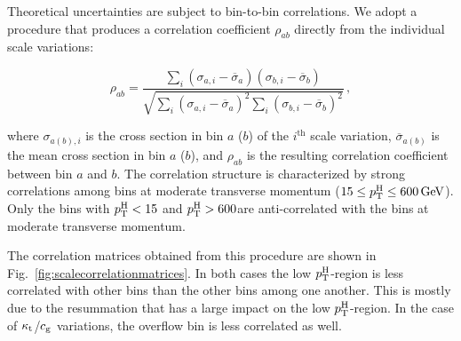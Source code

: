 Theoretical uncertainties are subject to bin-to-bin correlations.
% 
We adopt a procedure that produces a correlation coefficient $\rho_{ab}$ directly from the individual scale variations:
% 
\begin{linenomath*}
\begin{equation}
\rho_{ab} = 
\frac{
    \sum_i ( \sigma_{a, i} - \overline{\sigma}_a ) ( \sigma_{b, i} - \overline{\sigma}_b )
    }{
    \sqrt{
        \sum_i ( \sigma_{a, i} - \overline{\sigma}_a )^2
        \sum_i ( \sigma_{b, i} - \overline{\sigma}_b )^2
        }
    }
    \,,
\end{equation}
\end{linenomath*}
% 
where $\sigma_{a (b), i}$ is the cross section in bin $a$ ($b$) of the $i^\text{th}$ scale variation, $\overline{\sigma}_{a (b)}$ is the mean cross section in bin $a$ ($b$), and $\rho_{ab}$ is the resulting correlation coefficient between bin $a$ and $b$.
% 
The correlation structure is characterized by strong correlations among bins at moderate transverse momentum ($15 \leq p_\mathrm{T}^\mathrm{H} \leq 600\,\text{GeV}$).
% 
Only the bins with $p_\mathrm{T}^\mathrm{H}<15$ and $p_\mathrm{T}^\mathrm{H}>600$\GeV are anti-correlated with the bins at moderate transverse momentum.

The correlation matrices obtained from this procedure are shown in Fig.~\ref{fig:scalecorrelationmatrices}.
% 
In both cases the low $p_\mathrm{T}^\mathrm{H}$-region is less correlated with other bins than the other bins among one another.
% 
This is mostly due to the resummation that has a large impact on the low $p_\mathrm{T}^\mathrm{H}$-region.
% 
In the case of $\kappa_{\mathrm{t}}$/$c_\mathrm{g}$ variations, the overflow bin is less correlated as well.


